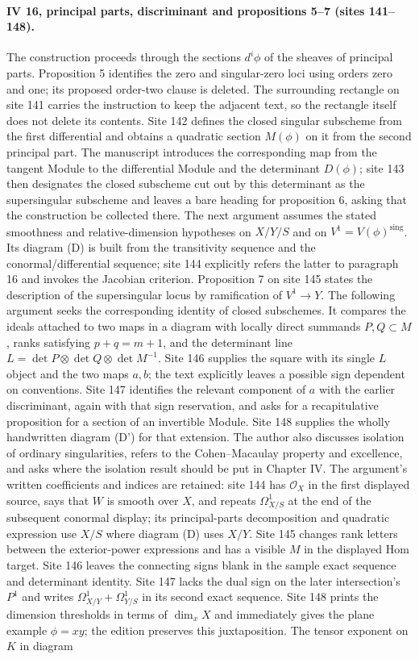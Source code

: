 \paragraph{IV 16, principal parts, discriminant and propositions 5--7 (sites 141--148).}
The construction proceeds through the sections $d^i\phi$ of the sheaves of principal parts. Proposition 5 identifies the zero and singular-zero loci using orders zero and one; its proposed order-two clause is deleted. The surrounding rectangle on site 141 carries the instruction to keep the adjacent text, so the rectangle itself does not delete its contents. Site 142 defines the closed singular subscheme from the first differential and obtains a quadratic section $M(\phi)$ on it from the second principal part. The manuscript introduces the corresponding map from the tangent Module to the differential Module and the determinant $D(\phi)$; site 143 then designates the closed subscheme cut out by this determinant as the supersingular subscheme and leaves a bare heading for proposition 6, asking that the construction be collected there. The next argument assumes the stated smoothness and relative-dimension hypotheses on $X/Y/S$ and on $V^1=V(\phi)^{\mathrm{sing}}$. Its diagram (D) is built from the transitivity sequence and the conormal/differential sequence; site 144 explicitly refers the latter to paragraph 16 and invokes the Jacobian criterion. Proposition 7 on site 145 states the description of the supersingular locus by ramification of $V^1\longrightarrow Y$. The following argument seeks the corresponding identity of closed subschemes. It compares the ideals attached to two maps in a diagram with locally direct summands $P,Q\subset M$, ranks satisfying $p+q=m+1$, and the determinant line $L=\det P\otimes\det Q\otimes\det M^{-1}$. Site 146 supplies the square with its single $L$ object and the two maps $a,b$; the text explicitly leaves a possible sign dependent on conventions. Site 147 identifies the relevant component of $a$ with the earlier discriminant, again with that sign reservation, and asks for a recapitulative proposition for a section of an invertible Module. Site 148 supplies the wholly handwritten diagram (D') for that extension. The author also discusses isolation of ordinary singularities, refers to the Cohen--Macaulay property and excellence, and asks where the isolation result should be put in Chapter IV. The argument's written coefficients and indices are retained: site 144 has $\mathcal O_X$ in the first displayed source, says that $W$ is smooth over $X$, and repeats $\Omega^1_{X/S}$ at the end of the subsequent conormal display; its principal-parts decomposition and quadratic expression use $X/S$ where diagram (D) uses $X/Y$. Site 145 changes rank letters between the exterior-power expressions and has a visible $M$ in the displayed Hom target. Site 146 leaves the connecting signs blank in the sample exact sequence and determinant identity. Site 147 lacks the dual sign on the later intersection's $P^1$ and writes $\Omega^1_{X/Y}+\Omega^1_{Y/S}$ in its second exact sequence. Site 148 prints the dimension thresholds in terms of $\dim_x X$ and immediately gives the plane example $\phi=xy$; the edition preserves this juxtaposition. The tensor exponent on $K$ in diagram 